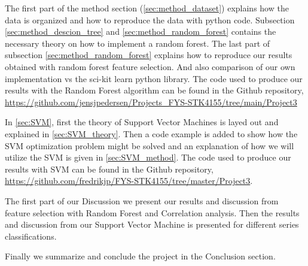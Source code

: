 The first part of the method section (\ref{sec:method_dataset}) explains how the data is organized and
how to reproduce the data with python code. Subsection
\ref{sec:method_descion_tree} and \ref{sec:method_random_forest} contains the
necessary theory on how to implement a random forest. The last part of
subsection \ref{sec:method_random_forest} explains how to reproduce our results
obtained with random forest feature selection. And also comparison of our own
implementation vs the sci-kit learn python library. The code used to produce
our results with the Random Forest algorithm can be found in the Github repository,
\url{https://github.com/jensjpedersen/Projects_FYS-STK4155/tree/main/Project3} 

In \autoref{sec:SVM}, first the theory of Support Vector Machines is layed out and explained
in \autoref{sec:SVM_theory}. Then a code example is added to show how the SVM optimization problem might be solved
and an explanation of how we will utilize the SVM is given in \autoref{sec:SVM_method}. 
The code used to produce our results with SVM can be found in the Github repository,
\url{https://github.com/fredrikjp/FYS-STK4155/tree/master/Project3}. 



The first part of our Discussion we present our results and discussion from
feature selection with Random Forest and Correlation analysis.  
Then the results and discussion from our Support Vector Machine is presented for 
different series classifications. 

Finally we summarize and conclude the project in the Conclusion section.  



